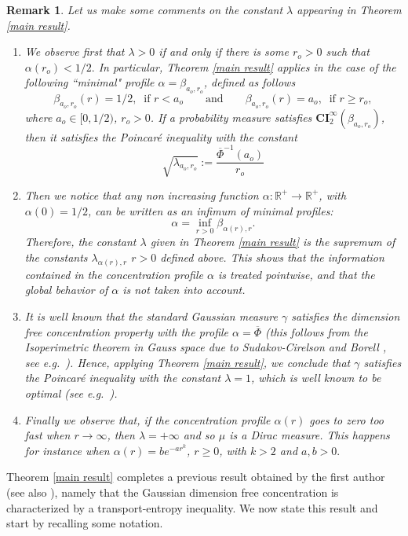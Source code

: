 \documentclass[11pt]{amsart}
\newtheorem{rem}[equation]{Remark}
\numberwithin{equation}{section}
\begin{document}
\begin{rem}\label{rem-intro}
Let us make some comments on the constant $\lambda$ appearing in Theorem \ref{main result}.
\begin{enumerate}
\item We observe first that $\lambda>0$ if and only if there is some $r_o>0$ such that $\alpha(r_o)<1/2.$ In particular, Theorem \ref{main result} applies in the case of the following ``minimal" profile $\alpha=\beta_{a_o,r_o}$, defined as follows
\begin{equation}\label{minimal profile}
\beta_{a_o,r_o}(r)=1/2,\ \text{ if } r<a_o\qquad\text{and}\qquad \beta_{a_o,r_o}(r)=a_o,\ \text { if } r\geq r_o,
\end{equation}
where  $a_o \in [0,1/2)$, $r_o>0$.
If a probability measure satisfies $\mathbf{CI}_2^\infty(\beta_{a_o,r_o})$, then it satisfies the Poincar\'e inequality  with the constant
\[
\sqrt{\lambda_{a_o,r_o}} :=  \frac{ \overline{\Phi}^{-1} \left(a_o\right)}{r_o}
\]
\item Then we notice that any non increasing function $\alpha:{\mathbb{R}}^+\to {\mathbb{R}}^+$, with $\alpha(0)=1/2$, can be written as an infimum of minimal profiles: 
\[
\alpha = \inf_{r>0} \beta_{\alpha(r),r}.
\]
Therefore, the constant $\lambda$ given in Theorem \ref{main result} is the supremum of the constants $\lambda_{\alpha(r),r}$ $r>0$ defined above. This shows that the information contained in the concentration profile $\alpha$ is treated pointwise, and that the global behavior of $\alpha$ is not taken into account. 
\item It is well known that the standard Gaussian measure $\gamma$ satisfies the dimension free concentration property with the profile $\alpha=\overline{\Phi}$ (this follows from the Isoperimetric theorem in Gauss space due to Sudakov-Cirelson \cite{SC74} and Borell \cite{Bor75}, see \textit{e.g.}\ \cite{Ledoux-book}). Hence, applying Theorem \ref{main result}, we conclude that $\gamma$ satisfies the Poincar\'e inequality with the constant $\lambda=1$, which is well known to be optimal (see \textit{e.g.}\ \cite[Chapter 1]{ane}).
\item Finally we observe that, if the concentration profile $\alpha(r)$ goes to zero too fast when $r\to \infty$, then $\lambda=+\infty$ and so $\mu$ is a Dirac measure. This happens for instance when $\alpha(r)=be^{-ar^k}$, $r\geq0$, with $k>2$ and $a,b>0.$
\end{enumerate}
\end{rem}
Theorem \ref{main result} completes a previous result obtained by the first author \cite{Goz09} (see also \cite{GRS11}), namely that the Gaussian dimension free concentration is characterized by a transport-entropy inequality. We now state this result and start by recalling some notation.
\end{document}
